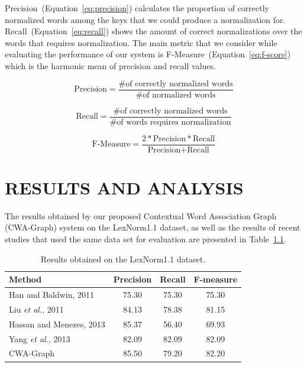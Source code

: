 \documentclass[a4paper,onesided,12pt]{report}
\begin{document}
Precision~(Equation~\ref{eq:precision}) calculates the proportion of correctly normalized words among the keys that we could produce a normalization for. Recall~(Equation~\ref{eq:recall}) shows the amount of correct normalizations over the words that requires normalization. The main metric that we consider while evaluating the performance of our system is F-Measure~(Equation~\ref{eq:f-score}) which is the harmonic mean of precision and recall values.

\begin{equation}
\text{Precision} = \frac{ \text{\# of correctly normalized words}}{ \text{\# of normalized words}}
\label{eq:precision}
\end{equation}

\begin{equation}
\text{Recall} = \frac{\text{\# of correctly normalized words}}{\text{\# of words requires normalization}}
\label{eq:recall}
\end{equation}

\begin{equation}
\text{F-Measure} = \frac{2 * \text{Precision} * \text{Recall} }{\text{Precision} + \text{Recall}}
\label{eq:f-score}
\end{equation}

\chapter{RESULTS AND ANALYSIS}

The results obtained by our proposed Contextual Word Association Graph (CWA-Graph) system on the LexNorm1.1 dataset,
as well as the results of recent studies that used the same data set for evaluation are presented in Table~\ref{tab:results}.

\begin{table}[thb]
  \caption{Results obtained on the LexNorm1.1 dataset.}
  \centering
  \begin{tabular}[t]{|l|c|c|c|}
    \hline
    \textbf{Method} & \textbf{Precision} & \textbf{Recall} & \textbf{F-measure} \\
    \hline
    Han and Baldwin, 2011 & 75.30 & 75.30 & 75.30 \\\hline
    Liu \textit{et al.}, 2011 & 84.13 & 78.38 & 81.15 \\\hline
    Hassan and Menezes, 2013 & 85.37 & 56.40 & 69.93 \\\hline
    Yang \textit{et al.}, 2013 & 82.09 & 82.09 & 82.09 \\\hline
    CWA-Graph   & 85.50 & 79.20 & 82.20 \\
    \hline
  \end{tabular}
  \label{tab:results}
\end{table}
\end{document}
